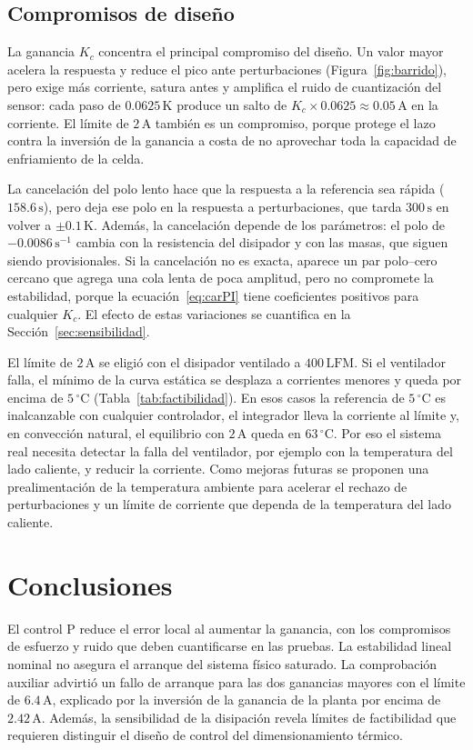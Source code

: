 \documentclass[journal,twocolumn]{IEEEtran}
\begin{document}
\subsection{Compromisos de diseño}\label{sec:compromisos}
La ganancia $K_c$ concentra el principal compromiso del diseño. Un valor mayor acelera la respuesta y reduce el pico ante perturbaciones (Figura~\ref{fig:barrido}), pero exige más corriente, satura antes y amplifica el ruido de cuantización del sensor: cada paso de $0.0625\,\mathrm K$ produce un salto de $K_c\times0.0625\approx0.05\,\mathrm A$ en la corriente. El límite de $2\,\mathrm A$ también es un compromiso, porque protege el lazo contra la inversión de la ganancia a costa de no aprovechar toda la capacidad de enfriamiento de la celda.

La cancelación del polo lento hace que la respuesta a la referencia sea rápida ($158.6\,\mathrm s$), pero deja ese polo en la respuesta a perturbaciones, que tarda $300\,\mathrm s$ en volver a $\pm0.1\,\mathrm K$. Además, la cancelación depende de los parámetros: el polo de $-0.0086\,\mathrm{s^{-1}}$ cambia con la resistencia del disipador y con las masas, que siguen siendo provisionales. Si la cancelación no es exacta, aparece un par polo--cero cercano que agrega una cola lenta de poca amplitud, pero no compromete la estabilidad, porque la ecuación~\eqref{eq:carPI} tiene coeficientes positivos para cualquier $K_c$. El efecto de estas variaciones se cuantifica en la Sección~\ref{sec:sensibilidad}.

El límite de $2\,\mathrm A$ se eligió con el disipador ventilado a $400\,\mathrm{LFM}$. Si el ventilador falla, el mínimo de la curva estática se desplaza a corrientes menores y queda por encima de $5\,^\circ\mathrm C$ (Tabla~\ref{tab:factibilidad}). En esos casos la referencia de $5\,^\circ\mathrm C$ es inalcanzable con cualquier controlador, el integrador lleva la corriente al límite y, en convección natural, el equilibrio con $2\,\mathrm A$ queda en $63\,^\circ\mathrm C$. Por eso el sistema real necesita detectar la falla del ventilador, por ejemplo con la temperatura del lado caliente, y reducir la corriente. Como mejoras futuras se proponen una prealimentación de la temperatura ambiente para acelerar el rechazo de perturbaciones y un límite de corriente que dependa de la temperatura del lado caliente.

\section{Conclusiones}\label{sec:conclusiones}
El control P reduce el error local al aumentar la ganancia, con los compromisos de esfuerzo y ruido que deben cuantificarse en las pruebas. La estabilidad lineal nominal no asegura el arranque del sistema físico saturado. La comprobación auxiliar advirtió un fallo de arranque para las dos ganancias mayores con el límite de $6.4\,\mathrm A$, explicado por la inversión de la ganancia de la planta por encima de $2.42\,\mathrm A$. Además, la sensibilidad de la disipación revela límites de factibilidad que requieren distinguir el diseño de control del dimensionamiento térmico.
\end{document}
